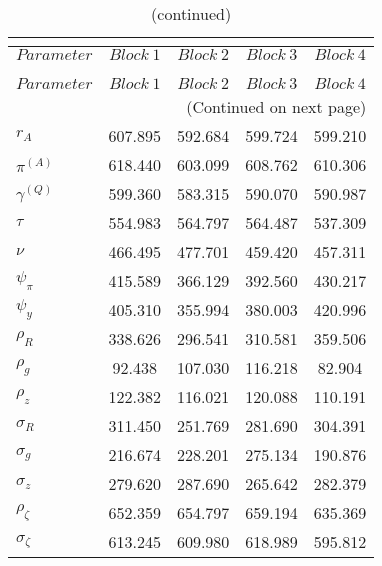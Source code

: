  
\begin{center}
\begin{longtable}{lcccc} 
\caption{MCMC Inefficiency factors per block}\\
 \label{Table:MCMC_inefficiency_factors}\\
\toprule 
$Parameter         $	 & 	 $     Block~1$	 & 	 $     Block~2$	 & 	 $     Block~3$	 & 	 $     Block~4$\\
\midrule \endfirsthead 
\caption{(continued)}\\
 \toprule \\ 
$Parameter         $	 & 	 $     Block~1$	 & 	 $     Block~2$	 & 	 $     Block~3$	 & 	 $     Block~4$\\
\midrule \endhead 
\midrule \multicolumn{5}{r}{(Continued on next page)} \\ \bottomrule \endfoot 
\bottomrule \endlastfoot 
$ {r_{A}}          $	 & 	     607.895	 & 	     592.684	 & 	     599.724	 & 	     599.210 \\ 
$ {\pi^{(A)}}      $	 & 	     618.440	 & 	     603.099	 & 	     608.762	 & 	     610.306 \\ 
$ {\gamma^{(Q)}}   $	 & 	     599.360	 & 	     583.315	 & 	     590.070	 & 	     590.987 \\ 
$ {\tau}           $	 & 	     554.983	 & 	     564.797	 & 	     564.487	 & 	     537.309 \\ 
$ {\nu}            $	 & 	     466.495	 & 	     477.701	 & 	     459.420	 & 	     457.311 \\ 
$ {\psi_\pi}       $	 & 	     415.589	 & 	     366.129	 & 	     392.560	 & 	     430.217 \\ 
$ {\psi_y}         $	 & 	     405.310	 & 	     355.994	 & 	     380.003	 & 	     420.996 \\ 
$ {\rho_R}         $	 & 	     338.626	 & 	     296.541	 & 	     310.581	 & 	     359.506 \\ 
$ {\rho_{g}}       $	 & 	      92.438	 & 	     107.030	 & 	     116.218	 & 	      82.904 \\ 
$ {\rho_z}         $	 & 	     122.382	 & 	     116.021	 & 	     120.088	 & 	     110.191 \\ 
$ {\sigma_R}       $	 & 	     311.450	 & 	     251.769	 & 	     281.690	 & 	     304.391 \\ 
$ {\sigma_{g}}     $	 & 	     216.674	 & 	     228.201	 & 	     275.134	 & 	     190.876 \\ 
$ {\sigma_z}       $	 & 	     279.620	 & 	     287.690	 & 	     265.642	 & 	     282.379 \\ 
$ {\rho_\zeta}     $	 & 	     652.359	 & 	     654.797	 & 	     659.194	 & 	     635.369 \\ 
$ {\sigma_\zeta}   $	 & 	     613.245	 & 	     609.980	 & 	     618.989	 & 	     595.812 \\ 
\end{longtable}
 \end{center}
